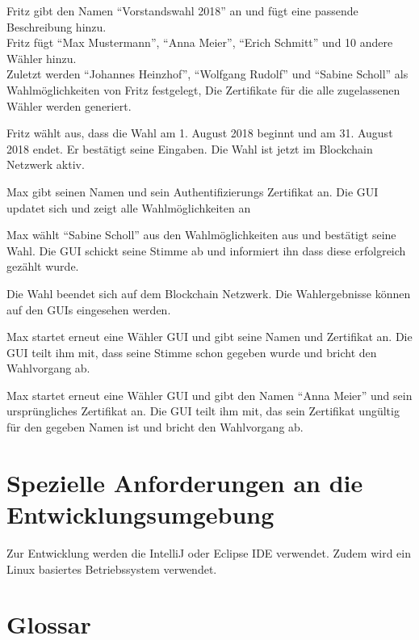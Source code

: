\documentclass[parskip=full,11pt,twoside]{scrartcl}
\begin{document}
		{Fritz gibt den Namen \enquote{Vorstandswahl 2018} an und fügt eine passende Beschreibung hinzu.\\
		Fritz fügt \enquote{Max Mustermann}, \enquote{Anna Meier}, \enquote{Erich Schmitt} und 10 andere Wähler hinzu.\\
		Zuletzt werden \enquote{Johannes Heinzhof}, \enquote{Wolfgang Rudolf} und \enquote{Sabine Scholl} als Wahlmöglichkeiten von Fritz festgelegt,}
		{Die Zertifikate für die alle zugelassenen Wähler werden generiert.}	
	
\teststep{}
		{Fritz wählt aus, dass die Wahl am 1. August 2018 beginnt und am 31. August 2018 endet. Er bestätigt seine Eingaben.}
		{Die Wahl ist jetzt im Blockchain Netzwerk aktiv.}

		{Max gibt seinen Namen und sein Authentifizierungs Zertifikat an.}
		{Die GUI updatet sich und zeigt alle Wahlmöglichkeiten an}
		
\teststep{}
		{Max wählt \enquote{Sabine Scholl} aus den Wahlmöglichkeiten aus und bestätigt seine Wahl.}
		{Die GUI schickt seine Stimme ab und informiert ihn dass diese erfolgreich gezählt wurde.}
		
		{Die Wahl beendet sich auf dem Blockchain Netzwerk.}
		{Die Wahlergebnisse können auf den GUIs eingesehen werden.}
		
		{Max startet erneut eine Wähler GUI und gibt seine Namen und Zertifikat an.}
		{Die GUI teilt ihm mit, dass seine Stimme schon gegeben wurde und bricht den Wahlvorgang ab.}

\teststep{}
		{Max startet erneut eine Wähler GUI und gibt den Namen \enquote{Anna Meier} und sein ursprüngliches Zertifikat an.}
		{Die GUI teilt ihm mit, das sein Zertifikat ungültig für den gegeben Namen ist und bricht den Wahlvorgang ab.}

\section{Spezielle Anforderungen an die Entwicklungsumgebung}
Zur Entwicklung werden die IntelliJ oder Eclipse IDE verwendet.
Zudem wird ein Linux basiertes Betriebssystem verwendet.

\section{Glossar}
\end{document}
